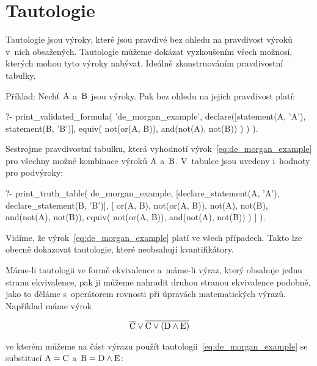\section{Tautologie}

Tautologie jsou výroky, které jsou pravdivé bez ohledu na pravdivost výroků v~nich obsažených. Tautologie můžeme dokázat vyzkoušením všech možnosí, kterých mohou tyto výroky nabývat. Ideálně zkonstruováním pravdivostní tabulky.

Příklad: Nechť \(\mathrm{A}\) a~\(\mathrm{B}\) jsou výroky. Pak bez ohledu na jejich pravdivost platí:

\begin{prolog}
?- print_validated_formula(
	'de_morgan_example',
	declare([statement(A, 'A'), statement(B, 'B')],
		equiv(
			not(or(A, B)),
			and(not(A), not(B))
		)
	)
).
\end{prolog}

Sestrojme pravdivostní tabulku, která vyhodnotí výrok~\eqref{eq:de_morgan_example} pro všechny možné kombinace výroků \(\mathrm{A}\) a~\(\mathrm{B}\). V~tabulce jsou uvedeny i~hodnoty pro podvýroky:

\begin{prolog}
?- print_truth_table(
	de_morgan_example,
	[declare_statement(A, 'A'), declare_statement(B, 'B')],
	[
		or(A, B),
		not(or(A, B)),
		not(A),
		not(B),
		and(not(A), not(B)),
		equiv(
			not(or(A, B)),
			and(not(A), not(B))
		)
	]
).
\end{prolog}

Vidíme, že výrok~\eqref{eq:de_morgan_example} platí ve všech případech. Takto lze obecně dokazovat tautologie, které neobsahují kvantifikátory.

Máme-li tautologii ve formě ekvivalence a~máme-li výraz, který obsahuje jednu stranu ekvivalence, pak ji můžeme nahradit druhou stranou ekvivalence podobně, jako to děláme s~operátorem rovnosti při úpravách matematických výrazů. Například máme výrok

\begin{equation}
\overline{\mathrm{C}} \lor \overline{\mathrm{C} \lor (\mathrm{D} \land \mathrm{E})}
\end{equation}

ve kterém můžeme na část výrazu použít tautologii~\eqref{eq:de_morgan_example} se substitucí \(\mathrm{A} = \mathrm{C}\) a~\(\mathrm{B} = \mathrm{D} \land \mathrm{E}\):

